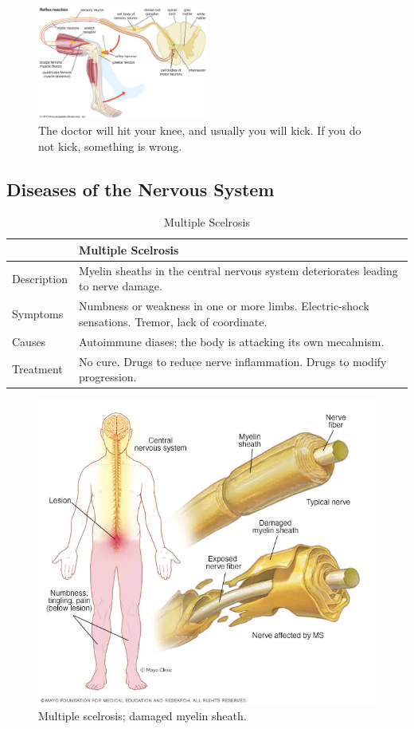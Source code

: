 \documentclass[12pt]{report}
\begin{document}
\begin{figure}[H]
\centering
    \includegraphics[width=0.5\textwidth]{../figures/reflexes.png}
    \caption{The doctor will hit your knee, and usually you will kick. If you do not kick, something is wrong.}
    \label{fig:reflexes}
\end{figure}

\subsection{Diseases of the Nervous System}
\begin{table}[h!]
    \renewcommand{\arraystretch}{1.5}

    \begin{center}
        \vspace{0.5em}
        \begin{tabular}{|p{}|p{}|}
        \hline
         & Multiple Scelrosis \\ 
        \hline
        Description & Myelin sheaths in the central nervous system deteriorates leading to nerve damage. \\
        \hline
        Symptoms & Numbness or weakness in one or more limbs. Electric-shock sensations. Tremor, lack of coordinate.\\ 
        \hline 
        Causes & Autoimmune diases; the body is attacking its own mecahnism.\\ 
        \hline 
        Treatment & No cure. Drugs to reduce nerve inflammation. Drugs to modify progression.\\ 
        \hline
        \end{tabular}
    \end{center}
    \caption{Multiple Scelrosis}
\end{table}

\begin{figure}[H]
\centering
    \includegraphics[width=0.5 \textwidth]{../figures/multiple scelrosis.png}
    \caption{Multiple scelrosis; damaged myelin sheath.}
    \label{fig:multiple-scelrosis}
\end{figure}
\end{document}
